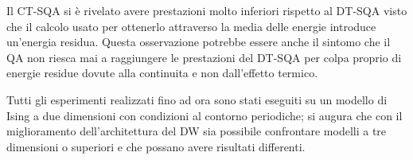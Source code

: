 Il CT-SQA si è rivelato avere prestazioni molto inferiori rispetto al DT-SQA visto che il calcolo usato per ottenerlo attraverso la media delle energie introduce un'energia residua. Questa osservazione potrebbe essere anche il sintomo che il QA non riesca mai a raggiungere le prestazioni del DT-SQA per colpa proprio di energie residue dovute alla continuita e non dall'effetto termico.

Tutti gli esperimenti realizzati fino ad ora sono stati eseguiti su un modello di Ising a due dimensioni con condizioni al contorno periodiche; si augura che con il miglioramento dell'architettura del DW sia possibile confrontare modelli a tre dimensioni o superiori e che possano avere risultati differenti.





